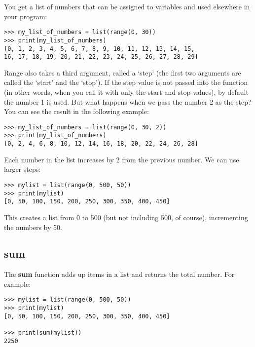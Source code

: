 \noindent
You get a list of numbers that can be assigned to variables and used elsewhere in your program:

\begin{Verbatim}[frame=single]
>>> my_list_of_numbers = list(range(0, 30))
>>> print(my_list_of_numbers)
[0, 1, 2, 3, 4, 5, 6, 7, 8, 9, 10, 11, 12, 13, 14, 15,
16, 17, 18, 19, 20, 21, 22, 23, 24, 25, 26, 27, 28, 29]
\end{Verbatim}

\noindent
Range also takes a third argument, called a `step' (the first two arguments are called the `start' and the `stop'). If the step value is not passed into the function (in other words, when you call it with only the start and stop values), by default the number 1 is used. But what happens when we pass the number 2 as the step?  You can see the result in the following example:

\begin{Verbatim}[frame=single]
>>> my_list_of_numbers = list(range(0, 30, 2))
>>> print(my_list_of_numbers)
[0, 2, 4, 6, 8, 10, 12, 14, 16, 18, 20, 22, 24, 26, 28]
\end{Verbatim}

\noindent
Each number in the list increases by 2 from the previous number. We can use larger steps:

\begin{Verbatim}[frame=single]
>>> mylist = list(range(0, 500, 50))
>>> print(mylist)
[0, 50, 100, 150, 200, 250, 300, 350, 400, 450]
\end{Verbatim}

This creates a list from 0 to 500 (but not including 500, of course), incrementing the numbers by 50.

\subsection*{sum}

The \textbf{sum} function adds up items in a list and returns the total number. For example:

\begin{Verbatim}[frame=single]
>>> mylist = list(range(0, 500, 50))
>>> print(mylist)
[0, 50, 100, 150, 200, 250, 300, 350, 400, 450]

>>> print(sum(mylist))
2250
\end{Verbatim}

\newpage
